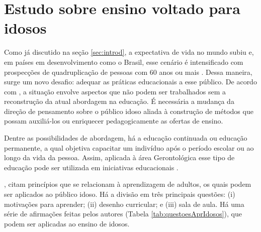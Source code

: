 \section{Estudo sobre ensino voltado para idosos}

Como já discutido na seção \ref{sec:introd}, a expectativa de vida no mundo subiu e, em países em desenvolvimento como o Brasil, esse cenário é intensificado com prospecções de quadruplicação de pessoas com 60 anos ou mais \citep{demografico2010disponivel}. Dessa maneira, surge um novo desafio: adequar as práticas educacionais a esse público. De acordo com \cite{rethinkingTeacherEducation}, a situação envolve aspectos que não podem ser trabalhados sem a reconstrução da atual abordagem na educação. É necessária a mudança da direção de pensamento sobre o público idoso aliada à construção de métodos que possam auxiliá-los ou enriquecer pedagogicamente as ofertas de ensino.

Dentre as possibilidades de abordagem, há a educação continuada ou educação permanente, a qual objetiva capacitar um indivíduo após o período escolar ou ao longo da vida da pessoa. Assim, aplicada à área Gerontológica esse tipo de educação pode ser utilizada em iniciativas educacionais \citep{neri2001palavras}. 

\cite{zemke198430}, citam princípios que se relacionam à aprendizagem de adultos, os quais podem ser aplicados ao público idoso. Há a divisão em três principais questões: (i) motivações para aprender; (ii) desenho curricular; e (iii) sala de aula. Há uma série de afirmações feitas pelos autores (Tabela \ref{tab:questoesAprIdosos}), que podem ser aplicadas ao ensino de idosos.


